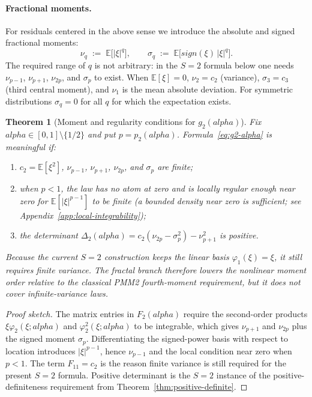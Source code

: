 \documentclass[11pt]{article}
\def\alpha{alpha}%
\def\mathbf#1{#1}%
\def\mathrm#1{#1}%
\def\tfrac#1#2{#1/#2}%
\newtheorem{theorem}{Theorem}[section]
\theoremstyle{definition}
\newcommand{\E}{\mathbb{E}}
\begin{document}
\paragraph{Fractional moments.}
For residuals centered in the above sense we introduce the absolute and
signed fractional moments:
\begin{equation}\label{eq:moments-q}
  \nu_q \;:=\; \E\bigl[|\xi|^q\bigr],
  \qquad
  \sigma_q \;:=\; \E\bigl[\mathrm{sign}(\xi)\,|\xi|^q\bigr].
\end{equation}
The required range of $q$ is not arbitrary: in the $S=2$ formula below one
needs $\nu_{p-1}$, $\nu_{p+1}$, $\nu_{2p}$, and $\sigma_p$ to exist. When
$\E[\xi]=0$, $\nu_2 = c_2$ (variance), $\sigma_3 = c_3$ (third central
moment), and $\nu_1$ is the mean absolute deviation. For symmetric
distributions $\sigma_q = 0$ for all $q$ for which the expectation exists.

\begin{theorem}[Moment and regularity conditions for $g_2(\alpha)$]\label{thm:g2-conditions}
Fix $\alpha\in[0,1]\setminus\{\tfrac{1}{2}\}$ and put
$p=p_2(\alpha)$. Formula~\eqref{eq:g2-alpha} is meaningful if:
\begin{enumerate}
  \item $c_2=\E[\xi^2]$, $\nu_{p-1}$, $\nu_{p+1}$, $\nu_{2p}$, and
        $\sigma_p$ are finite;
  \item when $p<1$, the law has no atom at zero and is locally regular
        enough near zero for $\E[|\xi|^{p-1}]$ to be finite
        (a bounded density near zero is sufficient; see
        Appendix~\ref{app:local-integrability});
  \item the determinant
        $\Delta_2(\alpha)=c_2(\nu_{2p}-\sigma_p^2)-\nu_{p+1}^2$ is positive.
\end{enumerate}
Because the current $S=2$ construction keeps the linear basis
$\varphi_1(\xi)=\xi$, it still requires finite variance.  The fractal branch
therefore lowers the nonlinear moment order relative to the classical PMM2
fourth-moment requirement, but it does not cover infinite-variance laws.
\end{theorem}

\begin{proof}[Proof sketch]
The matrix entries in $\mathbf{F}_2(\alpha)$ require the second-order
products $\xi\varphi_2(\xi;\alpha)$ and $\varphi_2^2(\xi;\alpha)$ to be
integrable, which gives $\nu_{p+1}$ and $\nu_{2p}$ plus the signed moment
$\sigma_p$. Differentiating the signed-power basis with respect to location
introduces $|\xi|^{p-1}$, hence $\nu_{p-1}$ and the local condition near
zero when $p<1$.  The term $F_{11}=c_2$ is the reason finite variance is
still required for the present $S=2$ formula. Positive determinant is the
$S=2$ instance of the positive-definiteness requirement from
Theorem~\ref{thm:positive-definite}.
\end{proof}
\end{document}
